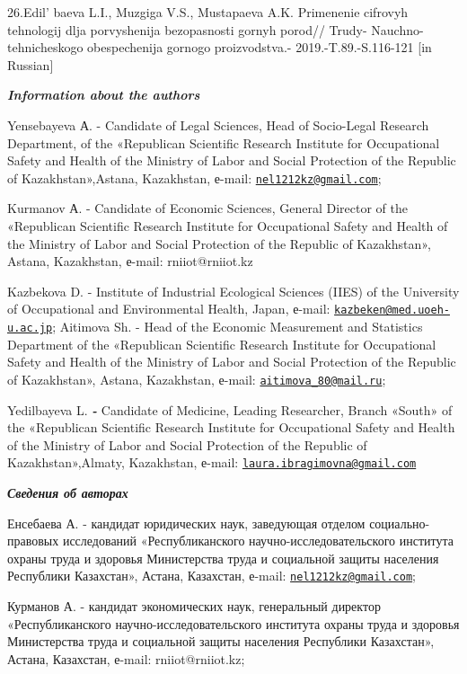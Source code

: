 26.Edil' baeva L.I., Muzgiga V.S., Mustapaeva A.K.
Primenenie cifrovyh tehnologij dlja porvyshenija bezopasnosti gornyh
porod// Trudy- Nauchno-tehnicheskogo obespechenija gornogo
proizvodstva.- 2019.-T.89.-S.116-121 {[}in Russian{]}

\emph{{\bfseries Information about the authors}}

Yensebayeva А. - Candidate of Legal Sciences, Head of Socio-Legal
Research Department, of the «Republican Scientific Research Institute
for Occupational Safety and Health of the Ministry of Labor and Social
Protection of the Republic of Kazakhstan»,Astana, Kazakhstan, е-mail:
\href{mailto:nel1212kz@gmail.com}{\nolinkurl{nel1212kz@gmail.com}};

Kurmanov А. - Candidate of Economic Sciences, General Director of the
«Republican Scientific Research Institute for Occupational Safety and
Health of the Ministry of Labor and Social Protection of the Republic of
Kazakhstan», Astana, Kazakhstan, е-mail: rniiot@rniiot.kz

Kazbekova D. - Institute of Industrial Ecological Sciences (IIES) of the
University of Occupational and Environmental Health, Japan, е-mail:
\href{mailto:kazbeken@med.uoeh-u.ac.jp}{\nolinkurl{kazbeken@med.uoeh-u.ac.jp}};
Aitimova Sh. - Head of the Economic Measurement and Statistics
Department of the «Republican Scientific Research Institute for
Occupational Safety and Health of the Ministry of Labor and Social
Protection of the Republic of Kazakhstan», Astana, Kazakhstan, е-mail:
\href{mailto:aitimova_80@mail.ru}{\nolinkurl{aitimova\_80@mail.ru}};

Yedilbayeva L. \emph{{\bfseries -}} Candidate of Medicine, Leading
Researcher, Branch «South» of the «Republican Scientific Research
Institute for Occupational Safety and Health of the Ministry of Labor
and Social Protection of the Republic of Kazakhstan»,Almaty, Kazakhstan,
е-mail:
\href{mailto:laura.ibragimovna@gmail.com}{\nolinkurl{laura.ibragimovna@gmail.com}}

\emph{{\bfseries Сведения об авторах}}

Енсебаева А. - кандидат юридических наук, заведующая отделом
социально-правовых исследований «Республиканского
научно-исследовательского института охраны труда и здоровья Министерства
труда и социальной защиты населения Республики Казахстан», Астана,
Казахстан, е-mail:
\href{mailto:nel1212kz@gmail.com}{\nolinkurl{nel1212kz@gmail.com}};

Курманов А. - кандидат экономических наук, генеральный директор
«Республиканского научно-исследовательского института охраны труда и
здоровья Министерства труда и социальной защиты населения Республики
Казахстан», Астана, Казахстан, е-mail: rniiot@rniiot.kz;

